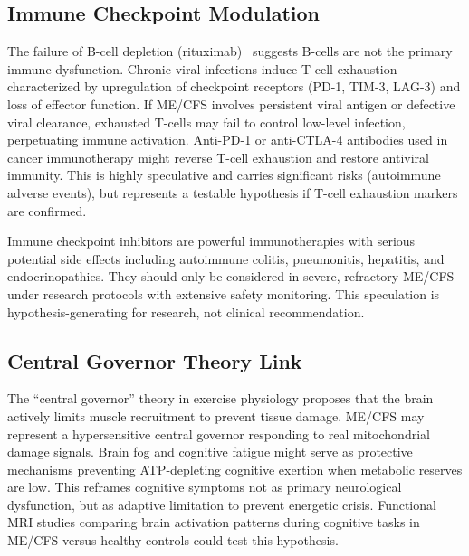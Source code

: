 \subsection{Immune Checkpoint Modulation}
\label{subsec:checkpoint-inhibition}

\begin{hypothesis}
\label{hyp:t-cell-exhaustion}
The failure of B-cell depletion (rituximab)~\cite{Fluge2019} suggests B-cells are not the primary immune dysfunction. Chronic viral infections induce T-cell exhaustion characterized by upregulation of checkpoint receptors (PD-1, TIM-3, LAG-3) and loss of effector function. If ME/CFS involves persistent viral antigen or defective viral clearance, exhausted T-cells may fail to control low-level infection, perpetuating immune activation. Anti-PD-1 or anti-CTLA-4 antibodies used in cancer immunotherapy might reverse T-cell exhaustion and restore antiviral immunity. This is highly speculative and carries significant risks (autoimmune adverse events), but represents a testable hypothesis if T-cell exhaustion markers are confirmed.
\end{hypothesis}

\begin{warning}
\label{warn:checkpoint-risk}
Immune checkpoint inhibitors are powerful immunotherapies with serious potential side effects including autoimmune colitis, pneumonitis, hepatitis, and endocrinopathies. They should only be considered in severe, refractory ME/CFS under research protocols with extensive safety monitoring. This speculation is hypothesis-generating for research, not clinical recommendation.
\end{warning}

\subsection{Central Governor Theory Link}
\label{subsec:central-governor}

\begin{hypothesis}
\label{hyp:central-governor}
The ``central governor'' theory in exercise physiology proposes that the brain actively limits muscle recruitment to prevent tissue damage. ME/CFS may represent a hypersensitive central governor responding to real mitochondrial damage signals. Brain fog and cognitive fatigue might serve as protective mechanisms preventing ATP-depleting cognitive exertion when metabolic reserves are low. This reframes cognitive symptoms not as primary neurological dysfunction, but as adaptive limitation to prevent energetic crisis. Functional MRI studies comparing brain activation patterns during cognitive tasks in ME/CFS versus healthy controls could test this hypothesis.
\end{hypothesis}

